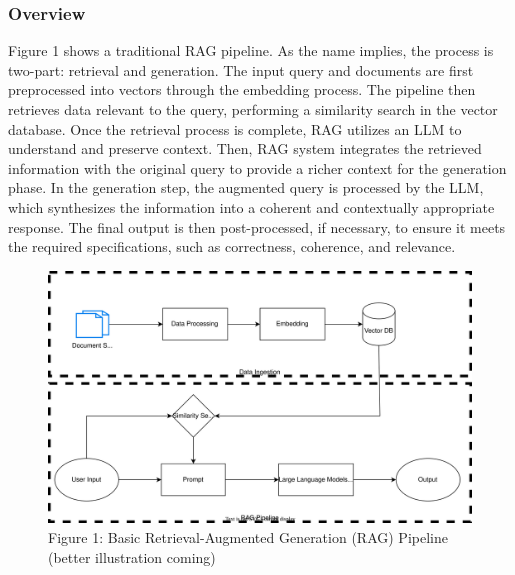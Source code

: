 \documentclass{scrartcl}
\begin{document}
\subsubsection{Overview}
Figure 1 shows a traditional RAG pipeline. As the name implies, the process is two-part: retrieval and generation. 
The input query and documents are first preprocessed into vectors through the embedding process. 
The pipeline then retrieves data relevant to the query, performing a similarity search in the vector database. Once the retrieval process is complete, RAG utilizes an LLM to understand and preserve context. Then, RAG system integrates the retrieved information with the original query to provide a richer context for the generation phase.
In the generation step, the augmented query is processed by the LLM, which synthesizes the information into a coherent and contextually appropriate response. The final output is then post-processed, if necessary, to ensure it meets the required specifications, such as correctness, coherence, and relevance. 
\begin{figure}[H]
	\begin{center}
		\includegraphics[scale=0.7]{basic_RAG_pipeline.drawio.svg}
	\end{center}
	\caption{Figure 1: Basic Retrieval-Augmented Generation (RAG) Pipeline (better illustration coming)}
	\label{fig:ascent}
\end{figure}
\end{document}
